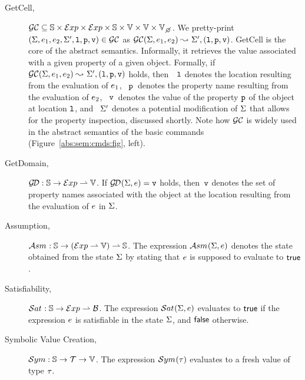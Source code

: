 \begin{description}
  \item[GetCell,] $\getcell \subseteq \absstates \times \exprs \times \exprs \times \absstates \times \absvals \times \absvals \times \setext{\absvals}{\none}$. 
          We pretty-print $(\Sigma, e_1, e_2, \Sigma', \mathtt{l}, \mathtt{p}, \mathtt{v}) \in \mathcal{GC}$ as $\mathcal{GC}(\Sigma, e_1, e_2) \leadsto_{} \Sigma', (\mathtt{l}, \mathtt{p}, \mathtt{v})$. 
          GetCell is the core of the abstract semantics. Informally, it retrieves the value associated with a given property of a given object. Formally, if $\mathcal{GC}(\Sigma, e_1, e_2) \leadsto_{} \Sigma', (\mathtt{l}, \mathtt{p}, \mathtt{v})$ holds, 
          then~~$\mathtt{l}$ denotes the location resulting from the evaluation of $e_1$, 
          ~$\mathtt{p}$~denotes the property name resulting from the evaluation of $e_2$, 
          ~$\mathtt{v}$~denotes the value of the property $\mathtt{p}$ of the object at location $\mathtt{l}$, 
          and ~$\Sigma'$ denotes a potential modification of $\Sigma$ that allows for the property inspection, discussed shortly. 
          Note how $\mathcal{GC}$ is widely used in the abstract semantics of the basic commands (Figure~\ref{abs:sem:cmds:fig}, left).
            

               
             
  \item[GetDomain,] $\mathcal{G\!D} : \mathbb{S} \rightarrow \mathcal{E}xp \rightharpoonup \mathbb{V}$. 
           If $\mathcal{G\!D}_{}(\Sigma, e) = \mathtt{v}$ holds, then~$\mathtt{v}$ denotes the 
           set of property names associated with the object at the location resulting from the evaluation of $e$ 
           in $\Sigma$.
   
   \item[Assumption,] $\mathcal{A}{sm}_{} : \mathbb{S} \rightarrow (\mathcal{E}xp \rightharpoonup \mathbb{V}) \rightharpoonup \mathbb{S}$. 
            The expression $\mathcal{A}{sm}_{}(\Sigma, e)$ denotes the state obtained from the state $\Sigma$ by stating that $e$ is supposed to evaluate to ${\sf true}$. 
  
   \item[Satisfiability,] $\mathcal{S}at_{} : \mathbb{S} \rightarrow \mathcal{E}xp \rightharpoonup \mathcal{B}$. 
            The expression $\mathcal{S}at_{}(\Sigma, e)$ evaluates to ${\sf true}$ if the \jsil expression $e$ is satisfiable in the  
            state $\Sigma$, and ${\sf false}$ otherwise.
             
   \item[Symbolic Value Creation,] $\mathcal{S}ym : \mathbb{S} \rightarrow \mathcal{T} \rightarrow \mathbb{V}$. 
            The expression $\mathcal{S}ym_{}(\tau)$ evaluates to a fresh  value of type $\tau$.
\end{description}


